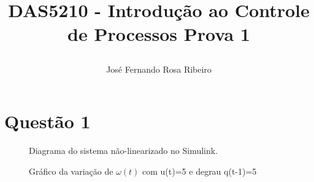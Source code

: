 \documentclass[11pt]{article}
\begin{document}
\author{
	José Fernando Rosa Ribeiro
}
\title{DAS5210 - Introdução ao Controle de Processos
	\newline
	\newline
	\large Prova 1
	\date{\vspace{-5ex}}}
\maketitle
\setcounter{secnumdepth}{0}

\section{Questão 1}
\begin{figure}[!htb]
	\caption{Diagrama do sistema não-linearizado no Simulink.}
\end{figure}

\begin{figure}[!htb]
	\caption{Gráfico da variação de $\omega(t)$ com u(t)=5 e degrau q(t-1)=5}
\end{figure}
\end{document}
